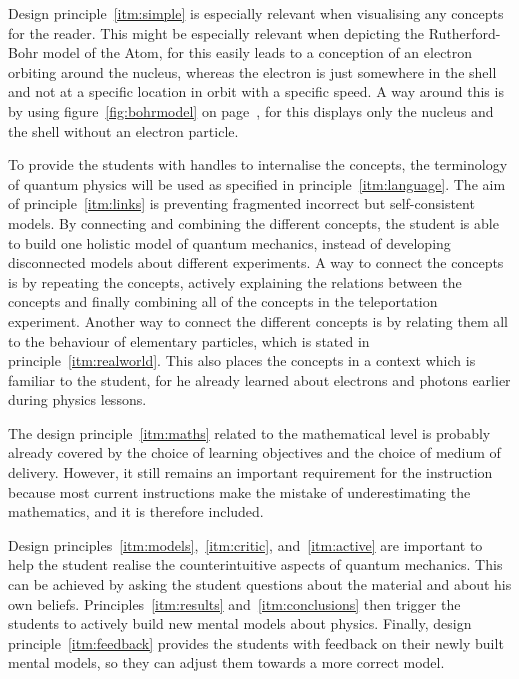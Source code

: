 \documentclass[11pt,twoside]{report} %
\begin{document}
Design principle~\ref{itm:simple} is especially relevant when visualising any concepts for the reader. This might be especially relevant when depicting the Rutherford-Bohr model of the Atom, for this easily leads to a conception of an electron orbiting around the nucleus, whereas the electron is just somewhere in the shell and not at a specific location in orbit with a specific speed. A way around this is by using figure~\ref{fig:bohrmodel} on page~\pageref{fig:bohrmodel}, for this displays only the nucleus and the shell without an electron particle.

To provide the students with handles to internalise the concepts, the terminology of quantum physics will be used as specified in principle~\ref{itm:language}. The aim of principle~\ref{itm:links} is preventing fragmented incorrect but self-consistent models. By connecting and combining the different concepts, the student is able to build one holistic model of quantum mechanics, instead of developing disconnected models about different experiments. A way to connect the concepts is by repeating the concepts, actively explaining  the relations between the concepts and finally combining all of the concepts in the teleportation experiment. Another way to connect the different concepts is by relating them all to the behaviour of elementary particles, which is stated in principle~\ref{itm:realworld}. This also places the concepts in a context which is familiar to the student, for he already learned about electrons and photons earlier during physics lessons.

The design principle~\ref{itm:maths} related to the mathematical level is probably already covered by the choice of learning objectives and the choice of medium of delivery. However, it still remains an important requirement for the instruction because most current instructions make the mistake of underestimating the mathematics, and it is therefore included.

Design principles~\ref{itm:models},~\ref{itm:critic}, and~\ref{itm:active} are important to help the student realise the counterintuitive aspects of quantum mechanics. This can be achieved by asking the student questions about the material and about his own beliefs. Principles~\ref{itm:results} and~\ref{itm:conclusions} then trigger the students to actively build new mental models about physics. Finally, design principle~\ref{itm:feedback} provides the students with feedback on their newly built mental models, so they can adjust them towards a more correct model.
\end{document}
